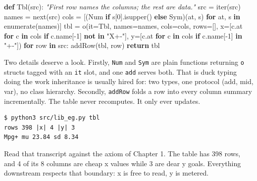 \documentclass[
  justified]{tufte-book}
\newenvironment{Shaded}{}{}
\newcommand{\BuiltInTok}[1]{\textcolor[rgb]{0.00,0.50,0.00}{#1}}
\newcommand{\CommentTok}[1]{\textcolor[rgb]{0.38,0.63,0.69}{\textit{#1}}}
\newcommand{\ControlFlowTok}[1]{\textcolor[rgb]{0.00,0.44,0.13}{\textbf{#1}}}
\newcommand{\DecValTok}[1]{\textcolor[rgb]{0.25,0.63,0.44}{#1}}
\newcommand{\KeywordTok}[1]{\textcolor[rgb]{0.00,0.44,0.13}{\textbf{#1}}}
\newcommand{\NormalTok}[1]{#1}
\newcommand{\OperatorTok}[1]{\textcolor[rgb]{0.40,0.40,0.40}{#1}}
\newcommand{\StringTok}[1]{\textcolor[rgb]{0.25,0.44,0.63}{#1}}
\begin{document}
\begin{Shaded}
\begin{Highlighting}[]
\KeywordTok{def}\NormalTok{ Tbl(src):}
  \CommentTok{"First row names the columns; the rest are data."}
\NormalTok{  src   }\OperatorTok{=} \BuiltInTok{iter}\NormalTok{(src)}
\NormalTok{  names }\OperatorTok{=} \BuiltInTok{next}\NormalTok{(src)}
\NormalTok{  cols  }\OperatorTok{=}\NormalTok{ [(Num }\ControlFlowTok{if}\NormalTok{ s[}\DecValTok{0}\NormalTok{].isupper() }\ControlFlowTok{else}\NormalTok{ Sym)(at, s)}
           \ControlFlowTok{for}\NormalTok{ at, s }\KeywordTok{in} \BuiltInTok{enumerate}\NormalTok{(names)]}
\NormalTok{  tbl   }\OperatorTok{=}\NormalTok{ o(it}\OperatorTok{=}\NormalTok{Tbl, names}\OperatorTok{=}\NormalTok{names, cols}\OperatorTok{=}\NormalTok{cols, rows}\OperatorTok{=}\NormalTok{[],}
\NormalTok{            x}\OperatorTok{=}\NormalTok{[c.at }\ControlFlowTok{for}\NormalTok{ c }\KeywordTok{in}\NormalTok{ cols}
               \ControlFlowTok{if}\NormalTok{ c.name[}\OperatorTok{{-}}\DecValTok{1}\NormalTok{] }\KeywordTok{not} \KeywordTok{in} \StringTok{"X+{-}"}\NormalTok{],}
\NormalTok{            y}\OperatorTok{=}\NormalTok{[c.at }\ControlFlowTok{for}\NormalTok{ c }\KeywordTok{in}\NormalTok{ cols }\ControlFlowTok{if}\NormalTok{ c.name[}\OperatorTok{{-}}\DecValTok{1}\NormalTok{] }\KeywordTok{in} \StringTok{"+{-}"}\NormalTok{])}
  \ControlFlowTok{for}\NormalTok{ row }\KeywordTok{in}\NormalTok{ src: addRow(tbl, row)}
  \ControlFlowTok{return}\NormalTok{ tbl}
\end{Highlighting}
\end{Shaded}

Two details deserve a look. Firstly, \texttt{Num} and \texttt{Sym} are
plain functions returning \texttt{o} structs tagged with an \texttt{it}
slot, and one \texttt{add} serves both. That is duck typing doing the
work inheritance is usually hired for: two types, one protocol (add,
mid, var), no class hierarchy. Secondly, \texttt{addRow} folds a row
into every column summary incrementally. The table never recomputes. It
only ever updates.

\begin{verbatim}
$ python3 src/lib_eg.py tbl
rows 398 |x| 4 |y| 3
Mpg+ mu 23.84 sd 8.34
\end{verbatim}

Read that transcript against the axiom of Chapter 1. The table has 398
rows, and 4 of its 8 columns are cheap x values while 3 are dear y
goals. Everything downstream respects that boundary: x is free to read,
y is metered.
\end{document}
